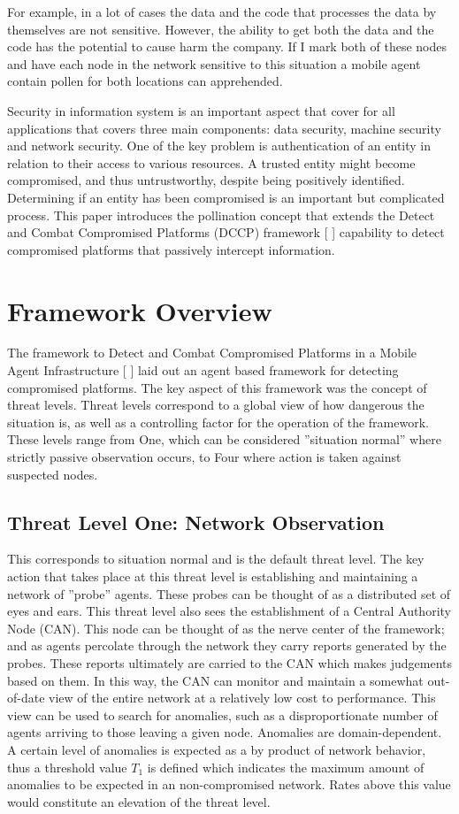 \documentclass{acm_proc_article-sp}
\begin{document}
For example, in a lot of cases the data and the code that processes the data by themselves are not sensitive. However, the ability to get both the data and the code has the potential to cause harm the company. If I mark both of these nodes and have each node in the network sensitive to this situation a mobile agent contain pollen for both locations can apprehended.



Security in information system is an important aspect that cover for all applications that covers three main components: data security, machine security and network security. One of the key problem is authentication of an entity in relation to their access to various resources. A trusted entity might become compromised, and thus untrustworthy, despite being positively identified.  Determining if an entity has been compromised is an important but complicated process. This paper introduces the pollination concept that extends the Detect and Combat Compromised Platforms (DCCP) framework [ ] capability to detect compromised platforms that passively intercept information.

\section{Framework Overview}
The framework to Detect and Combat Compromised Platforms in a Mobile Agent Infrastructure [ ] laid out an agent based framework for detecting compromised platforms.  The key aspect of this framework was the concept of threat levels.  Threat levels correspond to a global view of how dangerous the situation is, as well as a controlling factor for the operation of the framework.  These levels range from One, which can be considered ''situation normal'' where strictly passive observation occurs, to Four where action is taken against suspected nodes.  

\subsection{Threat Level One: Network Observation}
This corresponds to situation normal and is the default threat level.  The key action that takes place at this threat level is establishing and maintaining a network of ''probe'' agents.  These probes can be thought of as a distributed set of eyes and ears.  This threat level also sees the establishment of a Central Authority Node (CAN).  This node can be thought of as the nerve center of the framework; and as agents percolate through the network they carry reports generated by the probes.  These reports ultimately are carried to the CAN which makes judgements based on them.  In this way, the CAN can monitor and maintain a somewhat out-of-date view of the entire network at a relatively low cost to performance.  This view can be used to search for anomalies, such as a disproportionate number of agents arriving to those leaving a given node.  Anomalies are domain-dependent.  A certain level of anomalies is expected as a by product of network behavior, thus a threshold value $T_1$ is defined which indicates the maximum amount of anomalies to be expected in an non-compromised network.  Rates above this value would constitute an elevation of the threat level.
\end{document}
